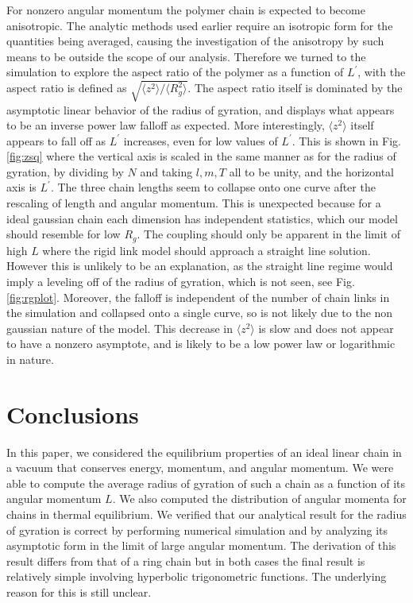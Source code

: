 \documentclass[11pt]{ucthesis}
\begin{document}
For nonzero angular momentum the polymer chain is expected to become
anisotropic. The analytic methods used earlier require an isotropic
form for the quantities being averaged, causing the investigation
of the anisotropy by such means to be outside the scope of our
analysis. Therefore we turned to the simulation to explore the aspect
ratio of the polymer as a function of $L^\prime$, with the aspect ratio is defined
as $\sqrt{\langle z^2 \rangle /\langle R_g^2 \rangle}$. The aspect ratio
itself is dominated by the asymptotic linear behavior of the radius of
gyration, and displays what appears to be an inverse power law falloff
as expected. More interestingly, $\langle z^2 \rangle$ itself appears to
fall off as $L^\prime$ increases, even for low values of $L^\prime$.  This is shown in Fig. \ref{fig:zsq}  where the
vertical axis is scaled in the same manner as for the radius of gyration,
by dividing by $N$ and taking $l,m,T$ all to be unity, and the horizontal axis is $L^\prime$.  The three chain lengths seem to collapse onto one curve after the rescaling of length
and angular momentum. This is unexpected because for a ideal gaussian
chain each dimension has independent statistics, which our model should resemble for low $R_g$. The coupling should only be apparent in the limit of high $L$ where 
the rigid link model should approach a straight line solution. However
this is unlikely to be an explanation, as the straight line regime
would imply a leveling off of the radius of gyration, which is not
seen, see Fig. \ref{fig:rgplot}. Moreover, the falloff is independent of the number of chain links
in the simulation and collapsed onto a single curve, so is not likely
due to the non gaussian nature of the model. This decrease in $\langle z^2 \rangle$ is slow and
does not appear to have a nonzero asymptote, and is likely to be a low
power law or logarithmic in nature.


\section{Conclusions}

In this paper, we considered the equilibrium properties of an ideal linear chain in a vacuum
that conserves energy, momentum, and angular momentum. We were able to compute the average
radius of gyration of such a chain as a function of its angular momentum $L$. We also computed
the distribution of angular momenta for chains in thermal equilibrium. 
We verified that our analytical result for the radius of gyration is correct by performing
numerical simulation and by analyzing its asymptotic form in the limit of large angular momentum.
The derivation of this result differs from that of a ring chain but in both cases the final
result is relatively simple involving hyperbolic trigonometric functions. The underlying reason
for this is still unclear.
\end{document}
